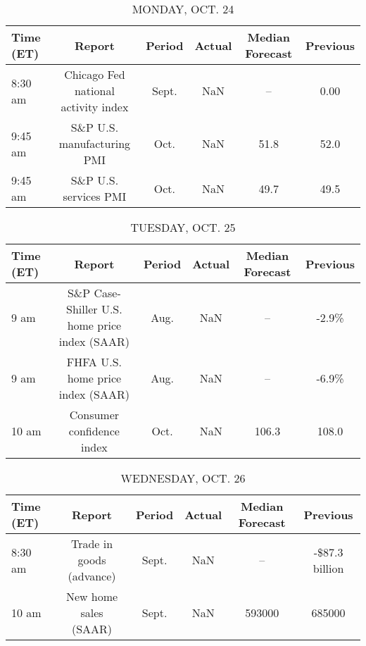 \documentclass{article}%
\begin{document}
%
\normalsize%


\begin{table}[htbp]%
\caption{MONDAY, OCT. 24}%
\centering%
\begin{adjustbox}{width=1\textwidth}%
\begin{tabular}{lccccc}
\toprule
Time (ET) &                              Report & Period & Actual & Median Forecast & Previous \\
\midrule
  8:30 am & Chicago Fed national activity index &  Sept. &    NaN &              -- &     0.00 \\
  9:45 am &          S\&P U.S. manufacturing PMI &   Oct. &    NaN &            51.8 &     52.0 \\
  9:45 am &               S\&P U.S. services PMI &   Oct. &    NaN &            49.7 &     49.5 \\
\bottomrule
\end{tabular}
%
\end{adjustbox}%
\end{table}

%


\begin{table}[htbp]%
\caption{TUESDAY, OCT. 25}%
\centering%
\begin{adjustbox}{width=1\textwidth}%
\begin{tabular}{lccccc}
\toprule
Time (ET) &                                        Report & Period & Actual & Median Forecast & Previous \\
\midrule
     9 am & S\&P Case-Shiller U.S. home price index (SAAR) &   Aug. &    NaN &              -- &    -2.9\% \\
     9 am &             FHFA U.S. home price index (SAAR) &   Aug. &    NaN &              -- &    -6.9\% \\
    10 am &                     Consumer confidence index &   Oct. &    NaN &           106.3 &    108.0 \\
\bottomrule
\end{tabular}
%
\end{adjustbox}%
\end{table}

%


\begin{table}[htbp]%
\caption{WEDNESDAY, OCT. 26}%
\centering%
\begin{adjustbox}{width=1\textwidth}%
\begin{tabular}{lccccc}
\toprule
Time (ET) &                   Report & Period & Actual & Median Forecast &       Previous \\
\midrule
  8:30 am & Trade in goods (advance) &  Sept. &    NaN &              -- & -\$87.3 billion \\
    10 am &    New home sales (SAAR) &  Sept. &    NaN &          593000 &         685000 \\
\bottomrule
\end{tabular}
%
\end{adjustbox}%
\end{table}
\end{document}
